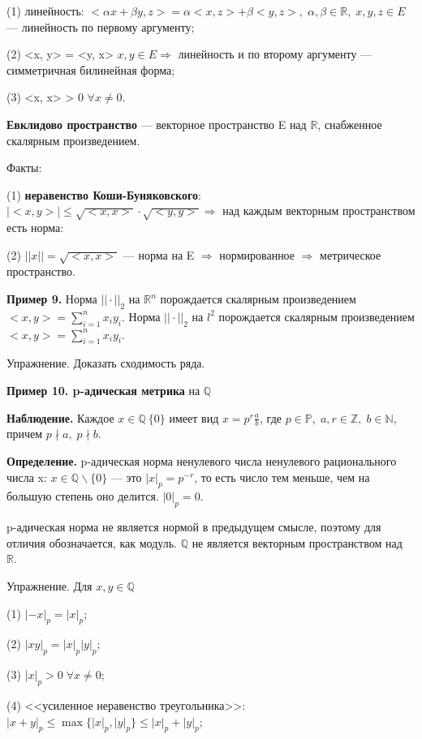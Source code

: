 \documentclass[12pt,a4paper]{article}
\begin{document}
(1) линейность: $<\alpha x + \beta y, z> = \alpha <x, z> + \beta <y, z>, \; \alpha, \beta \in \mathbb{R}, \; x, y, z \in E$ --- линейность по первому аргументу; 

(2) <x, y> = <y, x> $x, y \in E \Rightarrow$ линейность и по второму аргументу --- симметричная билинейная форма; 

(3) <x, x> > 0 $\forall x \neq 0$. 

\textbf{Евклидово пространство} --- векторное пространство E над $\mathbb{R}$, снабженное скалярным произведением. 

Факты: 

(1) \textbf{неравенство Коши-Буняковского}: $|<x, y>| \leqslant \sqrt{<x, x>} \cdot \sqrt{<y, y>} \Rightarrow$ над каждым векторным пространством есть норма: 

(2) $||x|| = \sqrt{<x, x>}$ --- норма на E $\Rightarrow$ нормированное $\Rightarrow$ метрическое пространство. 

\textbf{Пример 9.} Норма $|| \cdot ||_{2}$ на $\mathbb{R}^n$ порождается скалярным произведением $<x, y> = \sum_{i = 1}^{n}x_{i}y_{i}$. Норма $|| \cdot ||_{2}$ на $l^{2}$ порождается скалярным произведением $<x, y> = \sum_{i = 1}^{n} x_{i}y_{i}$. 

Упражнение. Доказать сходимость ряда. 

\textbf{Пример 10. p-адическая метрика} на $\mathbb{Q}$

\textbf{Наблюдение.} Каждое $x \in \mathbb{Q} \ \{0\}$ имеет вид $x = p^{r}\frac{a}{b}$, где $p \in \mathbb{P}, \; a, r \in \mathbb{Z}, \; b \in \mathbb{N}$, причем $p \nmid a, \; p \nmid b.$

\textbf{Определение.} p-адическая норма ненулевого числа ненулевого рационального числа x: $x \in \mathbb{Q} \backslash \{0\}$ --- это $|x|_{p} = p^{-r}$, то есть число тем меньше, чем на большую степень оно делится. $|0|_{p} = 0$.  

p-адическая норма не является нормой в предыдущем смысле, поэтому для отличия обозначается, как модуль. $\mathbb{Q}$ не является векторным пространством над $\mathbb{R}.$ 

Упражнение. Для $x, y \in \mathbb{Q}$

(1) $|-x|_{p} = |x|_{p};$

(2) $|xy|_{p} = |x|_{p}|y|_{p};$

(3) $|x|_{p} > 0 \; \forall x \neq 0;$

(4) <<усиленное неравенство треугольника>>: $|x + y|_{p} \leqslant \max\{|x|_{p}, |y|_{p}\} \leqslant |x|_{p} + |y|_{p};$
\end{document}
